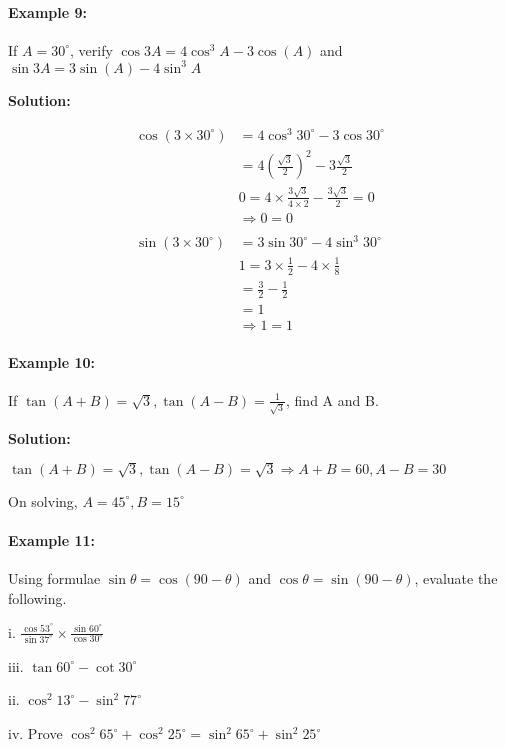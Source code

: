 \documentclass{article}
\begin{document}
\paragraph{Example 9:}
If $A = 30^{\circ}$, verify $\cos3A = 4\cos^{3}A - 3 \cos(A) $ and $\sin3A = 3\sin(A) - 4\sin^{3}A$

{\scriptsize \textbf{Solution:}}

\[
  \begin{aligned}
    \cos(3 \times 30^{\circ}) &= 4\cos^{3}30^{\circ} - 3\cos30^{\circ} \\
                         &= 4\left(\frac{\sqrt{3}}{2}\right)^{2} - 3\frac{\sqrt{3}}{2} \\
                         & 0 = 4 \times \frac{3\sqrt{3}}{4\times2} - \frac{3\sqrt{3}}{2} = 0 \\
                         &\Rightarrow 0 = 0 \\
    \\
    \sin(3 \times 30^{\circ}) &= 3\sin30^{\circ} - 4\sin^{3}30^{\circ} \\
                         & 1 = 3 \times \frac{1}{2} - 4 \times \frac{1}{8} \\
                         & = \frac{3}{2} - \frac{1}{2} \\
                         & = 1 \\
                         &\Rightarrow 1 = 1
  \end{aligned}
\]

\paragraph{Example 10:}
If $\tan(A+B) = \sqrt{3}, \tan(A-B)=\frac{1}{\sqrt{3}}$, find A and B.

{\scriptsize \textbf{Solution:}}

$\tan(A+B) = \sqrt{3}, \tan(A-B) = \sqrt{3} \Rightarrow A + B = 60, A - B = 30$

On solving, $A = 45^{\circ}, B = 15^{\circ}$

\paragraph{Example 11:}
Using formulae $\sin\theta = \cos(90-\theta)$ and $\cos\theta = \sin(90-\theta)$, evaluate the following.

\begin{enumerate}
        \begin{paracol}{2}
          \item[i.] $\frac{\cos53^{\circ}}{\sin37^{\circ}} \times \frac{\sin60^{\circ}}{\cos30^{\circ}}$
          \item[iii.] $\tan60^{\circ} - \cot30^{\circ}$
          \switchcolumn
          \item[ii.] $\cos^{2}13^{\circ} - \sin^{2}77^{\circ}$
          \item[iv.] Prove $\cos^{2}65^{\circ} + \cos^{2}25^{\circ} = \sin^{2}65^{\circ} + \sin^{2}25^{\circ}$
          \switchcolumn
        \end{paracol}
\end{enumerate}
\end{document}
